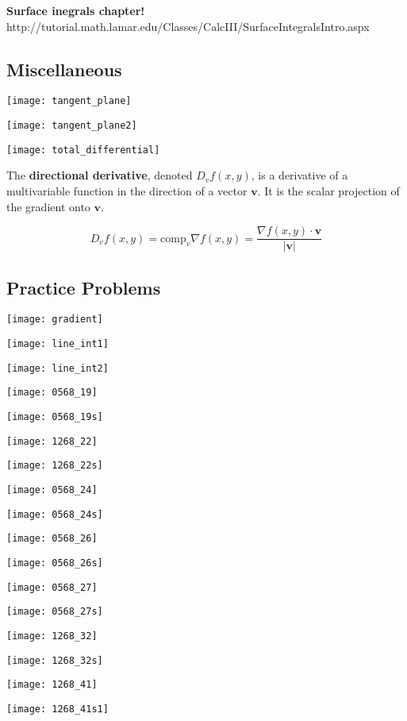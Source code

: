 \textbf{Surface inegrals chapter!} http://tutorial.math.lamar.edu/Classes/CalcIII/SurfaceIntegralsIntro.aspx

\subsection{Miscellaneous}

\texttt{[image: tangent\_plane]}

\texttt{[image: tangent\_plane2]}

\texttt{[image: total\_differential]}

The \textbf{directional derivative}, denoted \(D_v f(x, y)\), is a derivative of a multivariable function in the direction of a vector \(\boldsymbol{v}\). It is the scalar projection of the gradient onto \(\boldsymbol{v}\).

\[
D_v f(x, y) = \text{comp}_v \nabla f(x, y) = \frac{\nabla f(x, y) \cdot \boldsymbol{v}}{|\boldsymbol{v}|}
\]

\subsection{Practice Problems}

\texttt{[image: gradient]}

\texttt{[image: line\_int1]}

\texttt{[image: line\_int2]}

\texttt{[image: 0568\_19]}

\texttt{[image: 0568\_19s]}

\texttt{[image: 1268\_22]}

\texttt{[image: 1268\_22s]}

\texttt{[image: 0568\_24]}

\texttt{[image: 0568\_24s]}

\texttt{[image: 0568\_26]}

\texttt{[image: 0568\_26s]}

\texttt{[image: 0568\_27]}

\texttt{[image: 0568\_27s]}

\texttt{[image: 1268\_32]}

\texttt{[image: 1268\_32s]}

\texttt{[image: 1268\_41]}

\texttt{[image: 1268\_41s1]}

